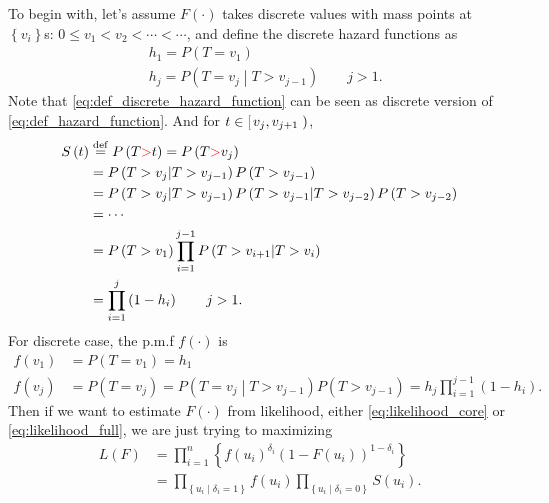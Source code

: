 \documentclass[a4paper,12pt]{article}
\begin{document}
To begin with, let's assume $F\left(\cdot\right)$ takes discrete values with mass points at $\left\{v_i\right\}$s: $0 \leq v_1 < v_2 < \cdots < \cdots$, and define the discrete hazard functions as
\begin{equation}
  \label{eq:def_discrete_hazard_function}
    \begin{aligned}
    & h_1 = P\left(T = v_1\right)    \\
    & h_j = P\left(T = v_j\middle| T > v_{j - 1}\right)
    \quad\quad j > 1.
  \end{aligned}
\end{equation}
Note that \eqref{eq:def_discrete_hazard_function} can be seen as discrete version of \eqref{eq:def_hazard_function}. And for $t \in {\color{red} \left[\right.} v_j, v_{j + 1}\left.\right)$,
\[
  \begin{aligned}
    S\left(t\right)
    &\overset{\mathrm{def}}{=} P\left(T {\color{red} >} t\right) = P\left(T {\color{red} > }v_j\right)    \\
    &= P\left(T > v_{j}\middle|T > v_{j - 1}\right)P\left(T > v_{j - 1}\right)    \\
    &= P\left(T > v_{j}\middle|T > v_{j - 1}\right)
    P\left(T > v_{j - 1}\middle| T > v_{j - 2}\right)P\left(T > v_{j - 2}\right)    \\
    & = \cdots    \\
    &= P\left(T > v_1\right)\prod\limits_{i = 1}^{j - 1}P\left(T > v_{i + 1}\middle| T > v_{i}\right)    \\
    &= \prod\limits_{i = 1}^j\left(1 - h_i\right)
    \quad\quad j > 1
    .
  \end{aligned}
\]
For discrete case, the p.m.f $f\left(\cdot\right)$ is
\[
  \begin{aligned}
    f\left(v_1\right) &= P\left(T = v_1\right) = h_1    \\
    f\left(v_j\right) &= P\left(T = v_j\right)
    = P\left(T = v_j\middle|T > v_{j - 1}\right)P\left(T > v_{j - 1}\right)
    = h_j\prod\limits_{i = 1}^{j - 1}\left(1 - h_i\right)
    .
  \end{aligned}
\]
Then if we want to estimate $F\left(\cdot\right)$ from likelihood, either \eqref{eq:likelihood_core} or \eqref{eq:likelihood_full}, we are just trying to maximizing
\[
  \begin{aligned}
    L\left(F\right)
    &= \prod\limits_{i = 1}^n\left\{
      f\left(u_i\right)^{\delta_i}
      \left(1 - F\left(u_i\right)\right)^{1 - \delta_i}
    \right\}    \\
    &= \prod\limits_{\left\{u_i\middle|\delta_i = 1\right\}}
    f\left(u_i\right)
    \prod\limits_{\left\{u_i\middle|\delta_i = 0\right\}}
    S\left(u_i\right)
    .
  \end{aligned}
\]
\end{document}
